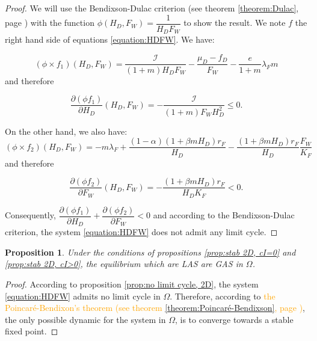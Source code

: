 \documentclass{article}
\newcommand{\lfw}{\lambda_{F}}
\newcommand{\lfw}{\lambda_{F}}
\newcommand{\cI}{\mathcal{I}}
\newcommand{\vdeux}[1]{\textcolor{orange}{#1}}
\newtheorem{prop}[theorem]{Proposition}
\theoremstyle{definition}
\theoremstyle{remark}
\begin{document}
\begin{proof}
We will use the Bendixson-Dulac criterion (see theorem \ref{theorem:Dulac}, page \pageref{theorem:Dulac}) with the function $\phi(H_D, F_W) = \dfrac{1}{H_D F_W}$ to show the result. We note $f$ the right hand side of equations \eqref{equation:HDFW}. We have:

\begin{equation*}
(\phi \times f_1)(H_D, F_W) = \dfrac{\cI}{(1+m)H_D F_W} -\dfrac{\mu_D - f_D}{F_W} - \dfrac{e}{1+m}\lfw m
\end{equation*} and therefore

\begin{equation*}
\dfrac{\partial (\phi f_1)}{\partial H_D}(H_D, F_W) = - \dfrac{\cI}{(1+m)F_W H_D^2} \leq 0.
\end{equation*}

On the other hand, we also have:
\begin{equation*}
(\phi \times f_2)(H_D, F_W) = - m \lfw + \dfrac{(1-\alpha) (1+ \beta m H_D) r_F}{H_D} - \dfrac{(1+\beta m H_D) r_F}{H_D} \dfrac{F_W}{K_F}
\end{equation*} and therefore

\begin{equation*}
\dfrac{\partial (\phi f_2)}{\partial F_W}(H_D, F_W) = - \dfrac{(1+\beta m H_D) r_F}{H_D K_F} <0.
\end{equation*}

Consequently, $\dfrac{\partial (\phi f_1)}{\partial H_D} + \dfrac{\partial (\phi f_2)}{\partial F_W} < 0$ and according to the Bendixson-Dulac criterion, the system \eqref{equation:HDFW} does not admit any limit cycle.

\end{proof}


\begin{prop} \label{prop:GAS, 2D}
Under the conditions of propositions \ref{prop:stab 2D, cI=0} and \ref{prop:stab 2D, cI>0}, the equilibrium which are LAS are GAS in $\Omega$.
\end{prop}


\begin{proof}
According to proposition \ref{prop:no limit cycle, 2D}, the system \eqref{equation:HDFW} admits no limit cycle in $\Omega$. Therefore, according to \vdeux{the Poincaré-Bendixon's theorem (see theorem \ref{theorem:Poincaré-Bendixson}, page \pageref{theorem:Poincaré-Bendixson})}, the only possible dynamic for the system in $\Omega$, is to converge towards a stable fixed point. 
\end{proof}
\end{document}

